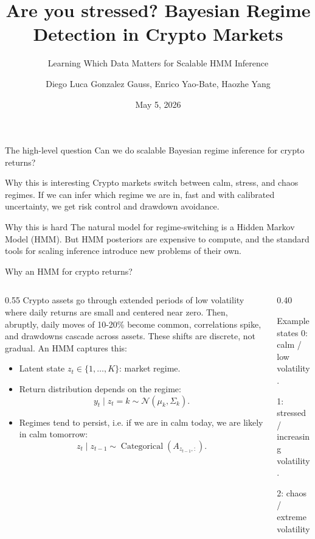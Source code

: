 \documentclass[aspectratio=169]{beamer}
\title{Are you stressed? Bayesian Regime Detection in Crypto Markets}
\subtitle{Learning Which Data Matters for Scalable HMM Inference}
\author{Diego Luca Gonzalez Gauss, Enrico Yao-Bate, Haozhe Yang}
\institute{STAT 221 Spring 2026 Final Project}
\date{May 5, 2026}
\begin{document}
\begin{frame}
  \titlepage
\end{frame}

\begin{frame}{The high-level question}
  \Large
  Can we do scalable Bayesian regime inference for crypto returns?

  \vspace{0.8em}
  \normalsize
  \begin{block}{Why this is interesting}
    Crypto markets switch between calm, stress, and chaos regimes. If we can infer which regime we are in, fast and with calibrated uncertainty, we get risk control and drawdown avoidance.
  \end{block}

  \begin{block}{Why this is hard}
    The natural model for regime-switching is a Hidden Markov Model (HMM). But HMM posteriors are expensive to compute, and the standard tools for scaling inference introduce new problems of their own.
  \end{block}
\end{frame}

\begin{frame}{Why an HMM for crypto returns?}
  \begin{columns}[T]
    \begin{column}{0.55\linewidth}
      Crypto assets go through extended periods of low volatility where daily returns are small and centered near zero. Then, abruptly, daily moves of 10-20\% become common, correlations spike, and drawdowns cascade across assets. These shifts are discrete, not gradual. An HMM captures this:
      \begin{itemize}
        \item Latent state $z_t \in \{1, \dots, K\}$: market regime.
        \item Return distribution depends on the regime:
        \[
          y_t \mid z_t=k \sim \mathcal{N}(\mu_k, \Sigma_k).
        \]
        \item Regimes tend to persist, i.e. if we are in calm today, we are likely in calm tomorrow:
        \[
          z_t \mid z_{t-1} \sim \operatorname{Categorical}(A_{z_{t-1},:}).
        \]
      \end{itemize}
    \end{column}
    \begin{column}{0.40\linewidth}
      \begin{block}{Example states}
        0: calm / low volatility.

        1: stressed / increasing volatility.

        2: chaos / extreme volatility
      \end{block}
    \end{column}
  \end{columns}
\end{frame}
\end{document}
